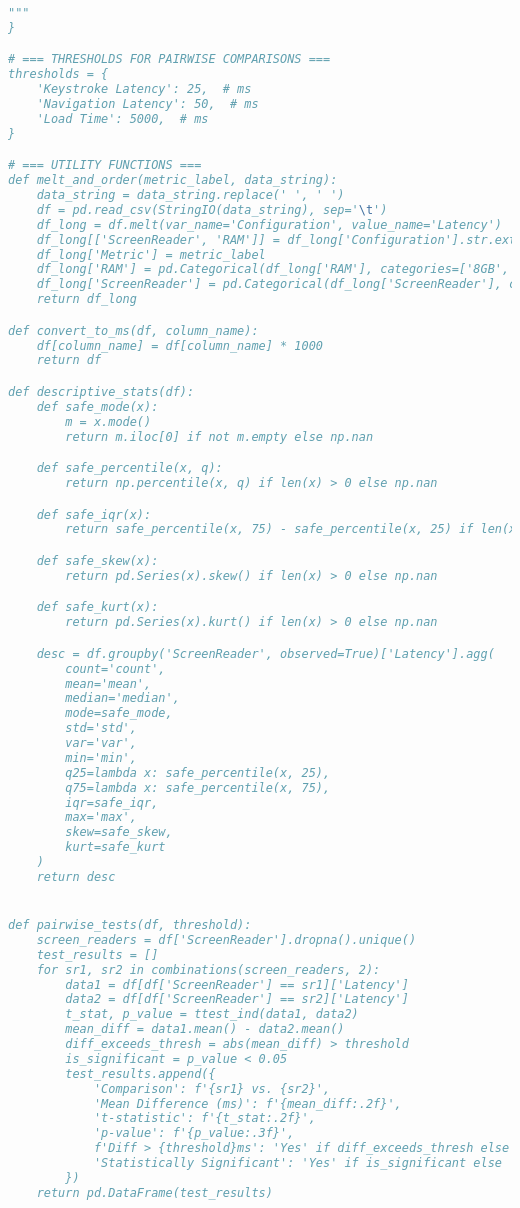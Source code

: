 \begin{lstlisting}[language=python]
"""
}

# === THRESHOLDS FOR PAIRWISE COMPARISONS ===
thresholds = {
    'Keystroke Latency': 25,  # ms
    'Navigation Latency': 50,  # ms
    'Load Time': 5000,  # ms
}

# === UTILITY FUNCTIONS ===
def melt_and_order(metric_label, data_string):
    data_string = data_string.replace(' ', ' ')
    df = pd.read_csv(StringIO(data_string), sep='\t')
    df_long = df.melt(var_name='Configuration', value_name='Latency')
    df_long[['ScreenReader', 'RAM']] = df_long['Configuration'].str.extract(r'([A-Z]+)(\d+GB)')
    df_long['Metric'] = metric_label
    df_long['RAM'] = pd.Categorical(df_long['RAM'], categories=['8GB', '16GB', '24GB', '32GB', '64GB'], ordered=True)
    df_long['ScreenReader'] = pd.Categorical(df_long['ScreenReader'], categories=SR_ORDER, ordered=True)
    return df_long

def convert_to_ms(df, column_name):
    df[column_name] = df[column_name] * 1000
    return df

def descriptive_stats(df):
    def safe_mode(x):
        m = x.mode()
        return m.iloc[0] if not m.empty else np.nan

    def safe_percentile(x, q):
        return np.percentile(x, q) if len(x) > 0 else np.nan

    def safe_iqr(x):
        return safe_percentile(x, 75) - safe_percentile(x, 25) if len(x) > 0 else np.nan

    def safe_skew(x):
        return pd.Series(x).skew() if len(x) > 0 else np.nan

    def safe_kurt(x):
        return pd.Series(x).kurt() if len(x) > 0 else np.nan

    desc = df.groupby('ScreenReader', observed=True)['Latency'].agg(
        count='count',
        mean='mean',
        median='median',
        mode=safe_mode,
        std='std',
        var='var',
        min='min',
        q25=lambda x: safe_percentile(x, 25),
        q75=lambda x: safe_percentile(x, 75),
        iqr=safe_iqr,
        max='max',
        skew=safe_skew,
        kurt=safe_kurt
    )
    return desc


def pairwise_tests(df, threshold):
    screen_readers = df['ScreenReader'].dropna().unique()
    test_results = []
    for sr1, sr2 in combinations(screen_readers, 2):
        data1 = df[df['ScreenReader'] == sr1]['Latency']
        data2 = df[df['ScreenReader'] == sr2]['Latency']
        t_stat, p_value = ttest_ind(data1, data2)
        mean_diff = data1.mean() - data2.mean()
        diff_exceeds_thresh = abs(mean_diff) > threshold
        is_significant = p_value < 0.05
        test_results.append({
            'Comparison': f'{sr1} vs. {sr2}',
            'Mean Difference (ms)': f'{mean_diff:.2f}',
            't-statistic': f'{t_stat:.2f}',
            'p-value': f'{p_value:.3f}',
            f'Diff > {threshold}ms': 'Yes' if diff_exceeds_thresh else 'No',
            'Statistically Significant': 'Yes' if is_significant else 'No'
        })
    return pd.DataFrame(test_results)


\end{lstlisting}
